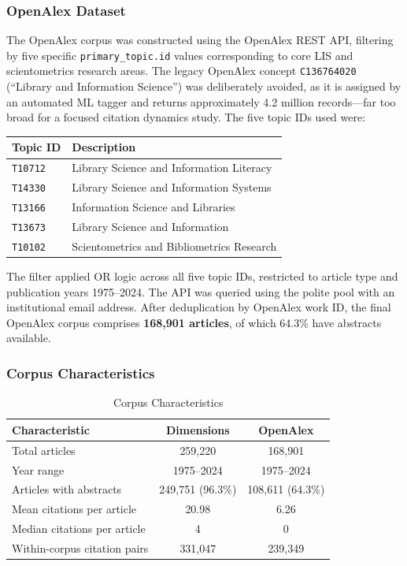 \documentclass[12pt,a4paper]{article}
\begin{document}
\subsubsection{OpenAlex Dataset}

The OpenAlex corpus was constructed using the OpenAlex REST API, filtering by five
specific \texttt{primary\_topic.id} values corresponding to core LIS and
scientometrics research areas. The legacy OpenAlex concept \texttt{C136764020}
(``Library and Information Science'') was deliberately avoided, as it is assigned
by an automated ML tagger and returns approximately 4.2 million records---far too
broad for a focused citation dynamics study. The five topic IDs used were:

\begin{center}
\begin{tabular}{ll}
\toprule
\textbf{Topic ID} & \textbf{Description} \\
\midrule
\texttt{T10712} & Library Science and Information Literacy \\
\texttt{T14330} & Library Science and Information Systems \\
\texttt{T13166} & Information Science and Libraries \\
\texttt{T13673} & Library Science and Information \\
\texttt{T10102} & Scientometrics and Bibliometrics Research \\
\bottomrule
\end{tabular}
\end{center}

The filter applied OR logic across all five topic IDs, restricted to article type
and publication years 1975--2024. The API was queried using the polite pool with
an institutional email address. After deduplication by OpenAlex work ID, the final
OpenAlex corpus comprises \textbf{168,901 articles}, of which 64.3\% have abstracts
available.

\subsubsection{Corpus Characteristics}

\begin{table}[H]
\centering
\caption{Corpus Characteristics}
\label{tab:corpus}
\begin{tabular}{lcc}
\toprule
\textbf{Characteristic} & \textbf{Dimensions} & \textbf{OpenAlex} \\
\midrule
Total articles & 259,220 & 168,901 \\
Year range & 1975--2024 & 1975--2024 \\
Articles with abstracts & 249,751 (96.3\%) & 108,611 (64.3\%) \\
Mean citations per article & 20.98 & 6.26 \\
Median citations per article & 4 & 0 \\
Within-corpus citation pairs & 331,047 & 239,349 \\
\bottomrule
\end{tabular}
\end{table}
\end{document}
